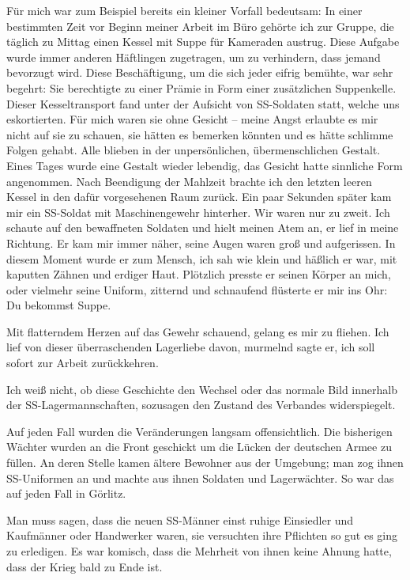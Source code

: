 \documentclass[a4paper,12pt,ngerman,
]{nisebook}
\begin{document}
Für mich war zum Beispiel bereits ein kleiner Vorfall bedeutsam: In einer bestimmten Zeit vor Beginn meiner Arbeit im Büro gehörte ich zur Gruppe, die täglich zu Mittag einen Kessel mit Suppe für Kameraden austrug. Diese Aufgabe wurde immer anderen Häftlingen zugetragen, um zu verhindern, dass jemand bevorzugt wird. Diese Beschäftigung, um die sich jeder eifrig bemühte, war sehr begehrt: Sie berechtigte zu einer Prämie in Form einer zusätzlichen Suppenkelle. Dieser Kesseltransport fand unter der Aufsicht von SS-Soldaten statt, welche uns eskortierten. Für mich waren sie ohne Gesicht -- meine Angst erlaubte es mir nicht auf sie zu schauen, sie hätten es bemerken könnten und es hätte schlimme Folgen gehabt. Alle blieben in der unpersönlichen, übermenschlichen Gestalt.
Eines Tages wurde eine Gestalt  wieder lebendig, das Gesicht hatte sinnliche Form angenommen. Nach Beendigung der Mahlzeit brachte ich den letzten leeren Kessel in den dafür vorgesehenen Raum zurück. Ein paar Sekunden später kam mir ein SS-Soldat mit Maschinengewehr hinterher. Wir waren nur zu zweit. Ich schaute auf den bewaffneten Soldaten und hielt meinen Atem an, er lief in meine Richtung. Er kam mir immer näher, seine Augen waren groß und aufgerissen. In diesem Moment wurde er zum Mensch, ich sah wie klein und häßlich er war, mit kaputten Zähnen und erdiger Haut. Plötzlich presste er seinen Körper an mich, oder vielmehr seine Uniform, zitternd und schnaufend flüsterte er mir ins Ohr: \glqq Du bekommst Suppe\grqq.

Mit flatterndem Herzen auf das Gewehr schauend, gelang es mir zu fliehen. 
Ich lief von dieser überraschenden Lagerliebe davon, murmelnd sagte er, ich soll sofort zur Arbeit zurückkehren.

Ich weiß nicht, ob diese Geschichte den Wechsel oder das normale Bild innerhalb der SS-La\-ger\-mann\-schaften, sozusagen den Zustand des Verbandes widerspiegelt.

Auf jeden Fall wurden die Veränderungen langsam offensichtlich. Die bisherigen Wächter wurden an die Front geschickt um die Lücken der deutschen Armee zu füllen. An deren Stelle kamen ältere Bewohner aus der Umgebung; man zog ihnen SS-Uniformen an und machte aus ihnen Soldaten und Lagerwächter. So war das auf jeden Fall in Görlitz.

Man muss sagen, dass die neuen SS-Männer einst ruhige Einsiedler und Kaufmänner oder Handwerker waren, sie versuchten ihre Pflichten so gut es ging zu erledigen. Es war komisch, dass die Mehrheit von ihnen keine Ahnung hatte, dass der Krieg bald zu Ende ist.
\end{document}
